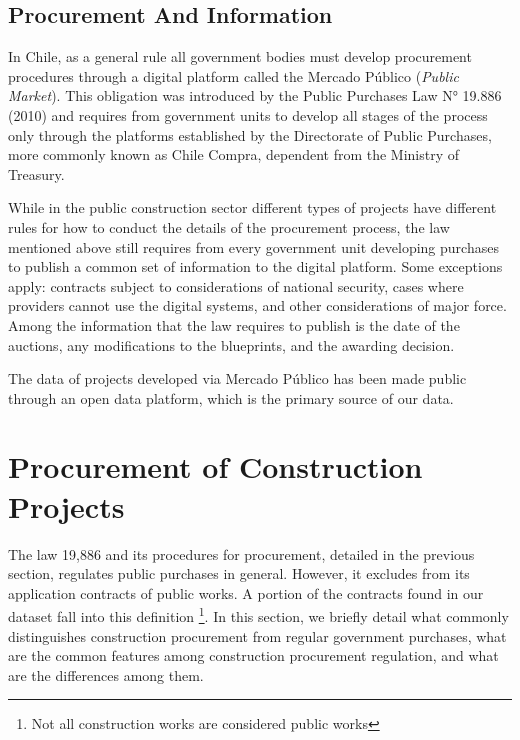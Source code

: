 \subsection{Procurement And Information}
In Chile, as a general rule all government bodies must develop procurement procedures through a digital platform called the Mercado Público (\textit{Public Market}).  This obligation was introduced by the Public Purchases Law N° 19.886 (2010) and requires from government units to develop all stages of the process only through the platforms established by the Directorate of Public Purchases, more commonly known as Chile Compra, dependent from the Ministry of Treasury.

While in the public construction sector different types of projects have different rules for how to conduct the details of the procurement process, the law mentioned above still requires from every government unit developing purchases to publish a common set of information to the digital platform. Some exceptions apply: contracts subject to considerations of national security, cases where providers cannot use the digital systems, and other considerations of major force. Among the information that the law requires to publish is the date of the auctions, any modifications to the blueprints, and the awarding decision.

The data of projects developed via Mercado Público has been made public through an open data platform, which is the primary source of our data.


\section{Procurement of Construction Projects}
The law 19,886 and its procedures for procurement, detailed in the previous section, regulates public purchases in general. However, it excludes from its application contracts of public works. A portion of the contracts found in our dataset fall into this definition \footnote{Not all construction works are considered public works}. In this section, we briefly detail what commonly distinguishes construction procurement from regular government purchases, what are the common features among construction procurement regulation, and what are the differences among them.

